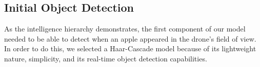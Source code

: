 \subsection{Initial Object Detection}
As the intelligence hierarchy demonstrates, the first component of our model needed to be able to detect when an apple appeared in the drone's field of view. 
In order to do this, we selected a Haar-Cascade model because of its lightweight nature, simplicity, and its real-time object detection capabilities. 